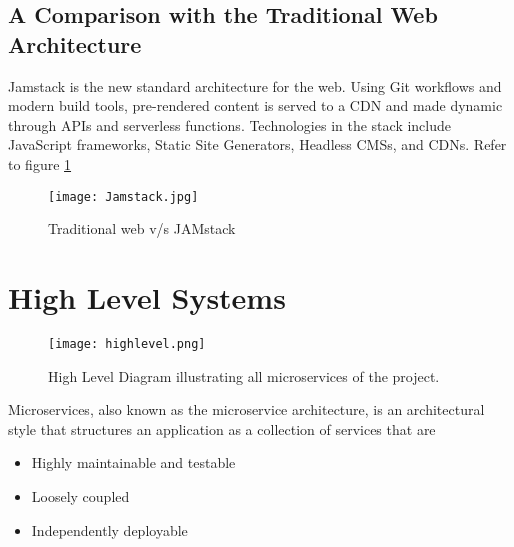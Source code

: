 \subsection{A Comparison with  the Traditional Web Architecture}

Jamstack is the new standard architecture for the web. Using Git workflows and modern build tools, pre-rendered content is served to a CDN and made dynamic through APIs and serverless functions. Technologies in the stack include JavaScript frameworks, 
Static Site Generators, Headless CMSs, and CDNs. Refer to figure \ref{fig:jamstack}

\begin{figure}[h!]
    \begin{center}
        \texttt{[image: Jamstack.jpg]}
    \end{center}
    \caption{Traditional web v/s JAMstack}
    \label{fig:jamstack}
\end{figure}

\section{High Level Systems}

\begin{figure}[h]
    \centering
    \texttt{[image: highlevel.png]}
    \caption{High Level Diagram illustrating all microservices of the project.}
    \label{fig:highlevel}
\end{figure}

Microservices, also known as the microservice architecture, is an architectural style that structures an 
application as a collection of services that are
\begin{itemize}
    \item Highly maintainable and testable
    \item Loosely coupled
    \item Independently deployable
\end{itemize}

